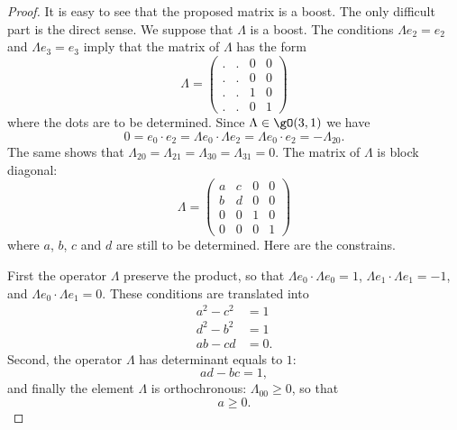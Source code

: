 \begin{proof}
    It is easy to see that the proposed matrix is a boost. The only difficult part is the direct sense. We suppose that \( \Lambda\) is a boost. The conditions \( \Lambda e_2=e_2\) and \( \Lambda e_3=e_3\) imply that the matrix of \( \Lambda\) has the form
    \begin{equation}
        \Lambda=\begin{pmatrix}
             .   &   .    &   0    &   0    \\
             .   &   .    &   0    &   0    \\
             .   &   .    &   1    &   0    \\ 
             .   &   .    &   0    &   1     
         \end{pmatrix}
    \end{equation}
    where the dots are to be determined. Since \( \Lambda\in\gO(3,1)\) we have
    \begin{equation}
        0=e_0\cdot e_2=\Lambda e_0\cdot \Lambda e_2=\Lambda e_0\cdot e_2=-\Lambda_{20}.
    \end{equation}
    The same shows that \( \Lambda_{20}=\Lambda_{21}=\Lambda_{30}=\Lambda_{31}=0\). The matrix of \( \Lambda\) is block diagonal:
    \begin{equation}
        \Lambda=\begin{pmatrix}
             a   &   c    &   0    &   0    \\
             b   &   d    &   0    &   0    \\
             0   &   0    &   1    &   0    \\ 
             0   &   0    &   0    &   1     
         \end{pmatrix}
    \end{equation}
    where \( a\), \( b\), \( c\) and \( d\) are still to be determined. Here are the constrains.

    First the operator \( \Lambda\) preserve the product, so that \( \Lambda e_0\cdot \Lambda e_0=1\), \( \Lambda e_1\cdot \Lambda e_1=-1\), and \( \Lambda e_0\cdot \Lambda e_1=0\). These conditions are translated into
    \begin{subequations}
        \begin{align}
            a^2-c^2&=1  \label{SUBEQooWEJSooPWfmNS}\\
            d^2-b^2&=1     \label{SUBEQooKLZFooCovszD}\\
            ab-cd&=0.      \label{SUBEQooUZQWooUxUCSe}
        \end{align}
    \end{subequations}
    Second, the operator \( \Lambda\) has determinant equals to \( 1\):
    \begin{equation}        \label{EQooJAEKooTCZaIG}
        ad-bc=1,
    \end{equation}
    and finally the element \( \Lambda\) is orthochronous: \( \Lambda_{00}\geq 0\), so that
    \begin{equation}        \label{EQooQCMYooPhHeas}
        a\geq 0.
    \end{equation}


\end{proof}
